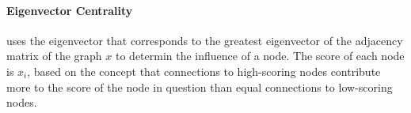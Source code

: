 \paragraph{Eigenvector Centrality} uses the eigenvector that corresponds to the greatest eigenvector of the adjacency matrix of the graph $x$ to determin the influence
of a node. The score of each node is $ x_i $, based on the concept that connections to high-scoring nodes contribute more to the score of the node in question than equal
connections to low-scoring nodes.


